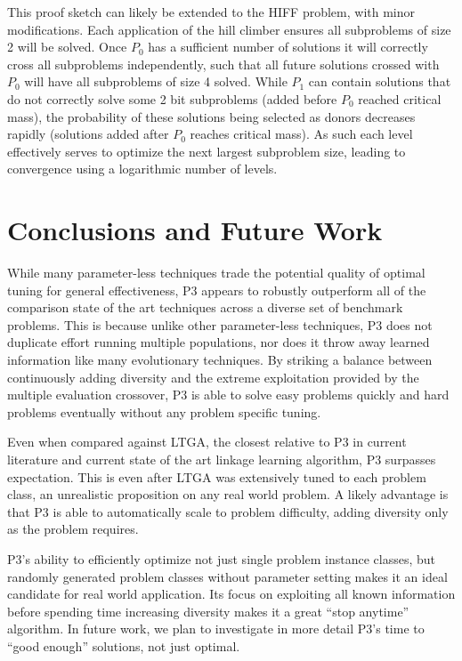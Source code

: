 \documentclass{sig-alternate}
\begin{document}
This proof sketch can likely be extended to the HIFF problem, with minor modifications.
Each application of the hill climber ensures all subproblems of size 2 will be solved.
Once $P_0$ has a sufficient number of solutions it will correctly cross all subproblems
independently, such that all future solutions crossed with $P_0$ will have all subproblems
of size 4 solved.  While $P_1$ can contain solutions that do not correctly solve some 2 bit
subproblems (added before $P_0$ reached critical mass), the probability of these solutions
being selected as donors decreases rapidly (solutions added after $P_0$ reaches critical mass).
As such each level effectively serves to optimize the next largest subproblem size, leading to
convergence using a logarithmic number of levels.


\section{Conclusions and Future Work}
While many parameter-less techniques trade the potential quality of optimal tuning
for general effectiveness, P3 appears to robustly outperform all of the comparison
state of the art techniques across a diverse set of benchmark problems.  This is
because unlike other parameter-less techniques, P3 does not duplicate effort running
multiple populations, nor does it throw away learned information like many evolutionary
techniques.  By striking
a balance between continuously adding diversity and the extreme exploitation provided
by the multiple evaluation crossover, P3 is able to solve easy problems quickly
and hard problems eventually without any problem specific tuning.

Even when compared against LTGA, the closest relative to P3 in current literature
and current state of the art linkage learning algorithm, P3 surpasses expectation.
This is even after LTGA was extensively tuned to each problem class, an unrealistic
proposition on any real world problem.  A likely advantage is that P3 is able to
automatically scale to problem difficulty, adding diversity only as the problem
requires.

P3's ability to efficiently optimize not just single problem instance classes,
but randomly generated problem classes without parameter setting makes it an
ideal candidate for real world application.  Its focus on exploiting all known
information before spending time increasing diversity makes it a great ``stop anytime''
algorithm.  In future work, we plan to investigate in more detail P3's time to
``good enough'' solutions, not just optimal.
\end{document}

